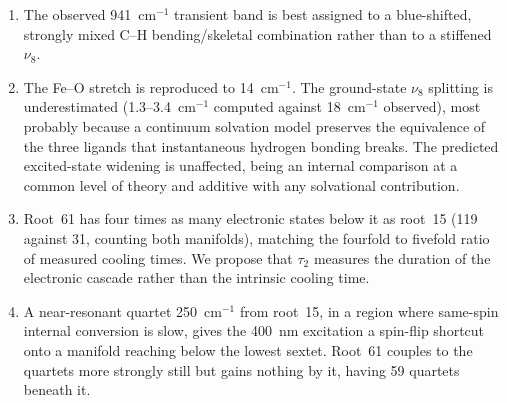 \documentclass[11pt,a4paper]{article}
\newcommand{\wn}{\ensuremath{\mathrm{cm^{-1}}}}
\begin{document}
\begin{enumerate}
      medians --- observable rather than exceptional.
\item The observed 941~\wn{} transient band is best assigned to a
      blue-shifted, strongly mixed C--H bending/skeletal combination rather
      than to a stiffened $\nu_8$.
\item The Fe--O stretch is reproduced to 14~\wn{}. The ground-state $\nu_8$
      splitting is underestimated (1.3--3.4~\wn{} computed against 18~\wn{}
      observed), most probably because a continuum solvation model preserves
      the equivalence of the three ligands that instantaneous hydrogen bonding
      breaks. The predicted excited-state widening is unaffected, being an
      internal comparison at a common level of theory and additive with any
      solvational contribution.
\item Root~61 has four times as many electronic states below it as root~15
      (119 against 31, counting both manifolds), matching the fourfold to
      fivefold ratio of measured cooling times. We propose that $\tau_2$
      measures the duration of the electronic cascade rather than the
      intrinsic cooling time.
\item A near-resonant quartet 250~\wn{} from root~15, in a region where
      same-spin internal conversion is slow, gives the 400~nm excitation a
      spin-flip shortcut onto a manifold reaching below the lowest sextet.
      Root~61 couples to the quartets more strongly still but gains nothing
      by it, having 59 quartets beneath it.
\end{enumerate}
\end{document}
